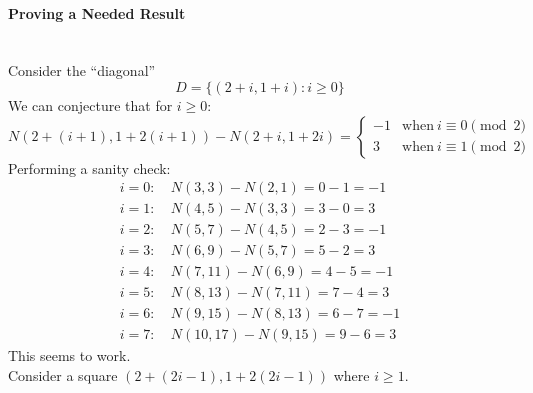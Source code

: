 \documentclass{article}
\begin{document}
\paragraph{Proving a Needed Result}\mbox{}\\
Consider the ``diagonal''
\begin{equation*}
  D = \{(2+i,1+i) : i \geq 0\}
\end{equation*}
We can conjecture that for $i\geq0$:
\begin{equation*}
N(2+(i+1),1+2(i+1))-N(2+i,1+2i) =
\begin{cases}
  -1 & \text{when}\  i \equiv 0 \pmod{2} \\
  3 & \text{when}\  i \equiv 1 \pmod{2}
\end{cases}
\end{equation*}
Performing a sanity check:
\begin{align*}
  i = 0: &\: N(3,3) - N(2,1) = 0 - 1 = -1 \\
  i = 1: &\: N(4,5) - N(3,3) = 3 - 0 = 3 \\
  i = 2: &\: N(5,7) - N(4,5) = 2 - 3 = -1 \\
  i = 3: &\: N(6,9) - N(5,7) = 5 - 2 = 3 \\
  i = 4: &\: N(7,11) - N(6,9) = 4 - 5 = -1 \\
  i = 5: &\: N(8,13) - N(7,11) = 7 - 4 = 3 \\
  i = 6: &\: N(9,15) - N(8,13) = 6 - 7 = -1 \\
  i = 7: &\: N(10,17) - N(9,15) = 9 - 6 = 3
\end{align*}
This seems to work. \\
Consider a square $(2+(2i-1),1+2(2i-1))$ where $i \geq 1$. 
\end{document}
